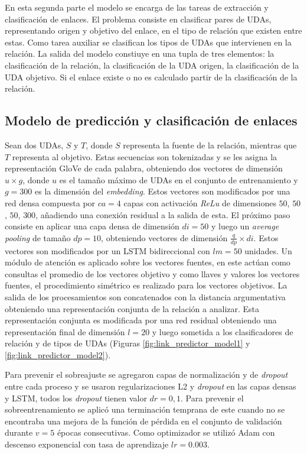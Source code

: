 En esta segunda parte el modelo se encarga de las tareas de extracción y clasificación de enlaces.
El problema consiste en clasificar pares de UDAs, representando origen y objetivo del enlace, 
en el tipo de relación que existen entre estas.
Como tarea auxiliar se clasifican los tipos de UDAs que intervienen en la relación. La salida 
del modelo constiuye en una tupla de tres elementos: la clasificación de la relación, 
la clasificación de la UDA origen, la clasificación de la UDA objetivo. Si el enlace existe o no 
es calculado partir de la clasificación de la relación.   

\subsection{Modelo de predicción y clasificación de enlaces}

Sean dos UDAs, $S$ y $T$, donde $S$ representa la fuente de la relación, mientras que $T$ representa
al objetivo. Estas secuencias son tokenizadas y se les asigna la representación GloVe de cada palabra, obteniendo
dos vectores de dimensión $u \times g$, donde $u$ es el tamaño máximo de UDAs en el conjunto de entrenamiento
y $g=300$ es la dimensión del \emph{embedding}.
Estos vectores son modificados por una red densa compuesta por $ca = 4$ capas con activación \emph{ReLu}
de dimensiones $50$, $50$, $50$, $300$, añadiendo una conexión residual a la salida de esta. 
El próximo paso consiste en aplicar una capa densa de dimensión $di=50$ y luego un \emph{average pooling}
de tamaño $dp=10$, obteniendo vectores de dimensión $\frac{q}{dp} \times di$. 
Estos vectores son modificados por un LSTM bidireccional con $lm=50$ unidades. Un módulo de atención es aplicado 
sobre los vectores fuentes, 
en este actúan como consultas el promedio de los vectores objetivo y como llaves y valores los vectores fuentes,
el procedimiento simétrico es realizado para los vectores objetivos.
La salida de los procesamientos son concatenados con la distancia argumentativa obteniendo una representación 
conjunta de la relación a analizar. Esta representación conjunta es modificada por una red residual obteniendo
una representación final de dimensión $l=20$ y luego sometida a los clasificadores de relación y de tipos de UDAs
(Figuras \ref{fig:link_predictor_model1} y \ref{fig:link_predictor_model2}).

Para prevenir el sobreajuste se agregaron capas de normalización y de \emph{dropout} entre cada 
proceso y se usaron regularizaciones L2 y \emph{dropout} en las capas densas y LSTM, 
todos los \emph{dropout} tienen valor $dr=0,1$. Para prevenir el sobreentrenamiento se aplicó una 
terminación temprana de este cuando no se encontraba una mejora de la función de pérdida en el 
conjunto de validación durante $v=5$ épocas consecutivas. Como optimizador se utilizó Adam con descenso 
exponencial con tasa de aprendizaje $lr=0.003$.

